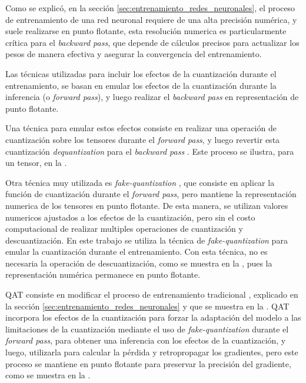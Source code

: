 Como se explicó, en la sección \ref{sec:entrenamiento_redes_neuronales}, el proceso de entrenamiento de una red neuronal requiere de una alta precisión numérica, y suele realizarse en punto flotante, esta resolución numerica es particularmente crítica para el \textit{backward pass}, que depende de cálculos precisos para actualizar los pesos de manera efectiva y asegurar la convergencia del entrenamiento.

Las técnicas utilizadas para incluir los efectos de la cuantización durante el entrenamiento, se basan en emular los efectos de la cuantización durante la inferencia (o \textit{forward pass}), y luego realizar el \textit{backward pass} en representación de punto flotante.

Una técnica para emular estos efectos consiste en realizar una operación de cuantización sobre los tensores durante el \textit{forward pass}, y luego revertir esta cuantización \textit{dequantization} para el \textit{backward pass} \cite{dai2024trainablefixedpointquantizationdeep}. Este proceso se ilustra, para un tensor, en la .


Otra técnica muy utilizada es \textit{fake-quantization} \cite{dai2024trainablefixedpointquantizationdeep}, que consiste en aplicar la función de cuantización durante el \textit{forward pass}, pero mantiene la representación numerica de los tensores en punto flotante. De esta manera, se utilizan valores numericos ajustados a los efectos de la cuantización, pero sin el costo computacional de realizar multiples operaciones de cuantización y descuantización. En este trabajo se utiliza la técnica de \textit{fake-quantization} para emular la cuantización durante el entrenamiento. Con esta técnica, no es necesaria la operación de descuantización, como se muestra en la , pues la representación numérica permanece en punto flotante.


QAT consiste en modificar el proceso de entrenamiento tradicional \cite{jacob2017quantizationtrainingneuralnetworks}, explicado en la sección \ref{sec:entrenamiento_redes_neuronales} y que se muestra en la . QAT incorpora los efectos de la cuantización para forzar la adaptación del modelo a las limitaciones de la cuantización mediante el uso de \textit{fake-quantization} durante el \textit{forward pass}, para obtener una inferencia con los efectos de la cuantización, y luego, utilizarla para calcular la pérdida y retropropagar los gradientes, pero este proceso se mantiene en punto flotante para preservar la precisión del gradiente, como se muestra en la .

